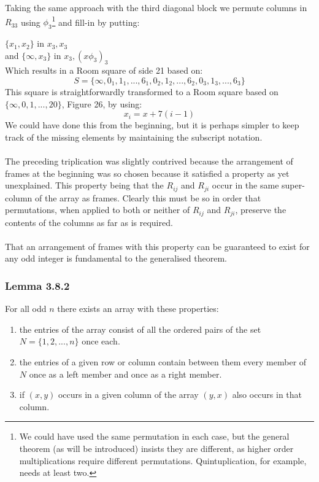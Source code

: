 \documentclass[
  12pt,
  a4paper]{book}
\begin{document}
Taking the same approach with the third diagonal block we permute
columns in \(R_{33}\) using \(\phi _3\)\footnote{We could have used the
  same permutation in each case, but the general theorem (as will be
  introduced) insists they are different, as higher order
  multiplications require different permutations. Quintuplication, for
  example, needs at least two.} and fill-in by putting:

\(\{x_1,x_2\}\) in \(x_3,x_3\)\\
and \(\{\infty,x_3\}\) in \(x_3,(x \phi _3)_3\)\\

Which results in a Room square of side 21 based on:
\[S = \{\infty,0_1,1_1,...,6_1,0_2,1_2,...,6_2,0_3,1_3,...,6_3\}\] This
square is straightforwardly transformed to a Room square based on
\(\{\infty,0,1,...,20\}\), Figure 26, by using: \[x_i=x+7(i-1)\] We
could have done this from the beginning, but it is perhaps simpler to
keep track of the missing elements by maintaining the subscript
notation.\\
~\\
The preceding triplication was slightly contrived because the
arrangement of frames at the beginning was so chosen because it
satisfied a property as yet unexplained. This property being that the
\(R_{ij}\) and \(R_{ji}\) occur in the same super-column of the array as
frames. Clearly this must be so in order that permutations, when applied
to both or neither of \(R_{ij}\) and \(R_{ji}\), preserve the contents
of the columns as far as is required.\\
~\\
That an arrangement of frames with this property can be guaranteed to
exist for any odd integer is fundamental to the generalised theorem.

\hypertarget{lemma-3.8.2}{%
\subsubsection{Lemma 3.8.2}\label{lemma-3.8.2}}

For all odd \(n\) there exists an array with these properties:

\begin{enumerate}
\def\labelenumi{\arabic{enumi}.}
\item
  the entries of the array consist of all the ordered pairs of the set
  \(N=\{1,2,...,n\}\) once each.
\item
  the entries of a given row or column contain between them every member
  of \(N\) once as a left member and once as a right member.
\item
  if \((x,y)\) occurs in a given column of the array \((y,x)\) also
  occurs in that column.
\end{enumerate}
\end{document}

